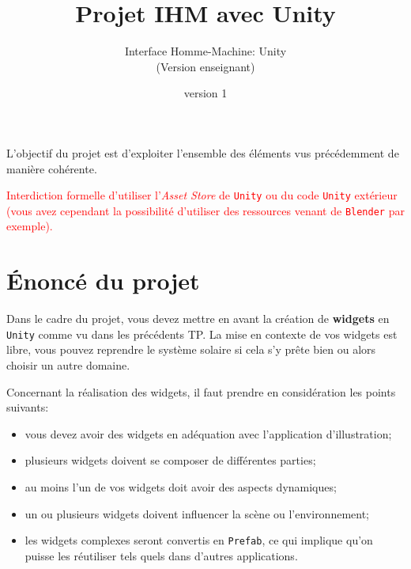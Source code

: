 \documentclass[a4paper,10pt]{article}
\begin{document}
	


\title{\vspace*{-1cm}Projet IHM avec Unity}
\author{\vspace*{-1.5cm}Interface Homme-Machine: Unity
\begin{ensnote}
	(Version enseignant)
\end{ensnote}
}
\date{\vspace*{-1.5cm}version 1}
\maketitle
\thispagestyle{fancy}

L'objectif du projet est d'exploiter l'ensemble des éléments vus précédemment de manière cohérente.

\textcolor{red}{Interdiction formelle d'utiliser l'\textit{Asset Store} de \texttt{Unity} ou du code \texttt{Unity} extérieur (vous avez cependant la possibilité d'utiliser des ressources venant de \texttt{Blender} par exemple).}


\section{\'Enoncé du projet}


Dans le cadre du projet, vous devez mettre en avant la création de \textbf{widgets} en \texttt{Unity} comme vu dans les précédents TP. La mise en contexte de vos widgets est libre, vous pouvez reprendre le système solaire si cela s'y prête bien ou alors choisir un autre domaine.

Concernant la réalisation des widgets, il faut prendre en considération les points suivants:
\begin{itemize}
	\item vous devez avoir des widgets en adéquation avec l'application d'illustration;
	\item plusieurs widgets doivent se composer de différentes parties;
	\item au moins l'un de vos widgets doit avoir des aspects dynamiques;
	\item un ou plusieurs widgets doivent influencer la scène ou l'environnement;
	\item les widgets complexes seront convertis en \texttt{Prefab}, ce qui implique qu'on puisse les réutiliser tels quels dans d'autres applications.
\end{itemize}
\end{document}
